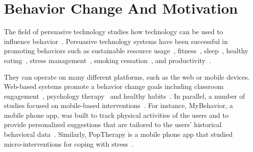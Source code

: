 \section{Behavior Change And Motivation}

The field of persuasive technology studies how technology can be used to influence behavior~\cite{fogg2002persuasive}. Persuasive technology systems have been successful in promoting behaviors such as sustainable resource usage~\cite{froehlich2009ubigreen}, fitness~\cite{consolvo2008activity}, sleep~\cite{kay2012lullaby,choe2011opportunities}, healthy eating~\cite{noronha2011platemate,epstein2016crumbs}, stress management~\cite{adams2014towards,sanches2010mind}, smoking cessation~\cite{paay2015personal}, and productivity~\cite{whittaker2016don, kim2016timeaware}.

They can operate on many different platforms, such as the web or mobile devices. Web-based systems promote a behavior change goals including classroom engagement~\cite{anderson2014engaging, anderson2013steering}, psychology therapy~\cite{doi:10.1080/15228830802094429} and healthy habits~\cite{cugelman2013gamification, lyons2014behavior}. In parallel, a number of studies focused on mobile-based interventions~\cite{paredes2014poptherapy, RILEY201567, FJELDSOE2009165, Whittaker09, info:doi/10.2196/mhealth.4160}. For instance, MyBehavior, a mobile phone app, was built to track physical activities of the users and to provide personalized suggestions that are tailored to the users' historical behavioral data~\cite{info:doi/10.2196/mhealth.4160}. Similarly, PopTherapy is a mobile phone app that studied micro-interventions for coping with stress~\cite{paredes2014poptherapy}.

